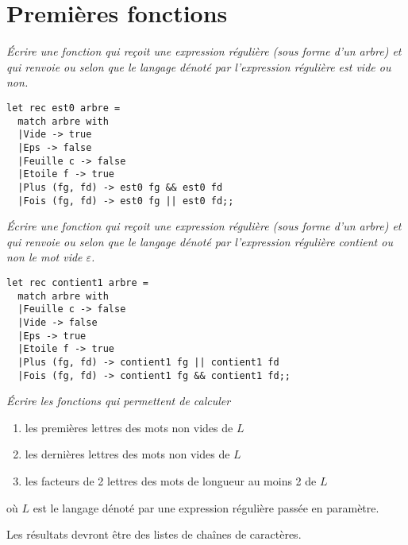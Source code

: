 \section{Premières fonctions}
\begin{Exercise}
\it Écrire une fonction  qui reçoit une expression régulière (sous forme d'un arbre) et qui renvoie  ou  selon que le langage dénoté par l'expression régulière est vide ou non.
\end{Exercise}
\begin{Answer}
\begin{lstlisting}
let rec est0 arbre = 
  match arbre with
  |Vide -> true
  |Eps -> false
  |Feuille c -> false
  |Etoile f -> true
  |Plus (fg, fd) -> est0 fg && est0 fd
  |Fois (fg, fd) -> est0 fg || est0 fd;;
\end{lstlisting}
\end{Answer}
\begin{Exercise}
{\it Écrire une fonction  qui reçoit une expression régulière (sous forme d'un arbre) et qui renvoie  ou  selon que le langage dénoté par l'expression régulière contient ou non le mot vide $\varepsilon$.}
\end{Exercise}
\begin{Answer}
\begin{lstlisting}
let rec contient1 arbre = 
  match arbre with
  |Feuille c -> false
  |Vide -> false
  |Eps -> true
  |Etoile f -> true
  |Plus (fg, fd) -> contient1 fg || contient1 fd
  |Fois (fg, fd) -> contient1 fg && contient1 fd;;
\end{lstlisting}
\end{Answer}
\begin{Exercise}
{\it Écrire les fonctions qui permettent de calculer 
\begin{enumerate}
\item les premières lettres des mots non vides de $L$
\item les dernières lettres des mots non vides de $L$
\item les facteurs de 2 lettres des mots de longueur au moins 2 de $L$
\end{enumerate} 

où $L$ est le langage dénoté par une expression régulière passée en paramètre.

Les résultats devront être des listes de chaînes de caractères.}
\end{Exercise}
